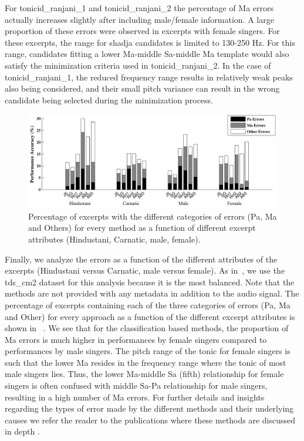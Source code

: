 {{For \acrshort{tonicid_ranjani_1} and \acrshort{tonicid_ranjani_2} the percentage of Ma errors actually increases slightly after including male/female information. A large proportion of these errors were observed in excerpts with female singers. For these excerpts, the range for \gls{shadja} candidates is limited to 130-250 Hz. For this range, candidates fitting a lower Ma-middle Sa-middle Ma template would also satisfy the minimization criteria used in \acrshort{tonicid_ranjani_2}. In the case of \acrshort{tonicid_ranjani_1}, the reduced frequency range results in relatively weak peaks also being considered, and their small pitch variance can result in the wrong candidate being selected during the minimization process.

\begin{figure}
	\begin{center}
		\includegraphics[width=\figSizeHundred]{ch05_preprocessing/figures/Category_Errors.pdf}
	\end{center}
	\caption{Percentage of excerpts with the different categories of errors (Pa, Ma and Others) for every method as a function of different excerpt attributes (Hindustani, Carnatic, male, female).}
	\label{fig:tonic_identification_categorywise_errors}
\end{figure}

Finally, we analyze the errors as a function of the different attributes of the excerpts (Hindustani versus Carnatic, male versus female). As in~, we use the \acrshort{tds_cm2} dataset for this analysis because it is the most balanced. Note that the methods are not provided with any metadata in addition to the audio signal. The percentage of excerpts containing each of the three categories of errors (Pa, Ma and Other) for every approach as a function of the different excerpt attributes is shown in ~. We see that for the classification based methods, the proportion of Ma errors is much higher in performances by female singers compared to performances by male singers. The pitch range of the tonic for female singers is such that the lower Ma resides in the frequency range where the tonic of most male singers lies. Thus, the lower Ma-middle Sa (fifth) relationship for female singers is often confused with middle Sa-Pa relationship for male singers, resulting in a high number of Ma errors. For further details and insights regarding the types of error made by the
different methods and their underlying causes we refer the reader to the publications where these methods are discussed in depth \citep{salamon2012multipitch, SGulati_MThesis2012,bellur2012knowledge,ranjani2011carnatic}.


}}
